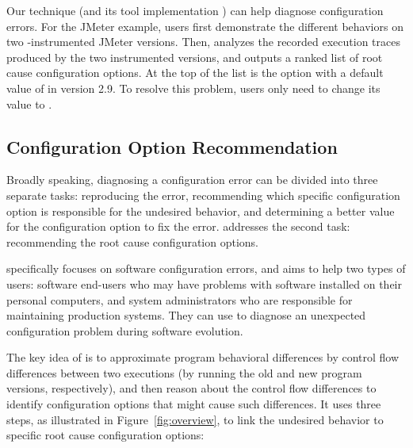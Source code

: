 
Our technique (and its tool implementation \ourtool) can help
diagnose configuration errors. For the JMeter example,
users first demonstrate the different
behaviors on two \ourtool-instrumented
JMeter versions. Then, \ourtool analyzes the
recorded execution traces produced by the two instrumented
versions, and outputs a ranked list of root cause configuration options.
At the top of the list is the
 option with a default value of 
in version 2.9.
To resolve this problem, users only need to change
its value to .

\subsection{Configuration Option Recommendation}

Broadly speaking, diagnosing a configuration
error can be divided into three separate tasks:
reproducing the error, recommending which specific
configuration option is responsible for the undesired
behavior, and determining a better value for the
configuration option to fix the error. \ourtool addresses
the second task: recommending the root cause configuration options.

\ourtool specifically focuses on software configuration errors, and
aims to help two types of users: software end-users
who may have problems with software installed on their
personal computers, and system administrators who are
responsible for maintaining production systems.
They can use \ourtool to diagnose an unexpected configuration
problem during software evolution. 


The key idea of \ourtool is to approximate program behavioral
differences by control flow differences between 
two executions (by running the old
and new program versions, respectively),
and then reason about the control flow differences to
identify configuration options that
might cause such differences. It uses
three steps, as illustrated in Figure~\ref{fig:overview},  to link the undesired
behavior to specific root cause configuration options:

